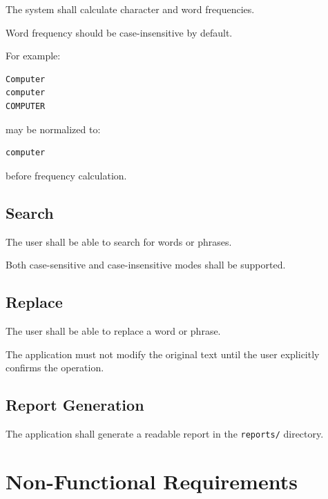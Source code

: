 \documentclass[12pt,a4paper]{article}
\begin{document}
The system shall calculate character and word frequencies.

Word frequency should be case-insensitive by default.

For example:

\begin{verbatim}
Computer
computer
COMPUTER
\end{verbatim}

may be normalized to:

\begin{verbatim}
computer
\end{verbatim}

before frequency calculation.

\subsection{Search}

The user shall be able to search for words or phrases.

Both case-sensitive and case-insensitive modes shall be supported.

\subsection{Replace}

The user shall be able to replace a word or phrase.

The application must not modify the original text until the user
explicitly confirms the operation.

\subsection{Report Generation}

The application shall generate a readable report in the
\texttt{reports/} directory.


\section{Non-Functional Requirements}
\end{document}
